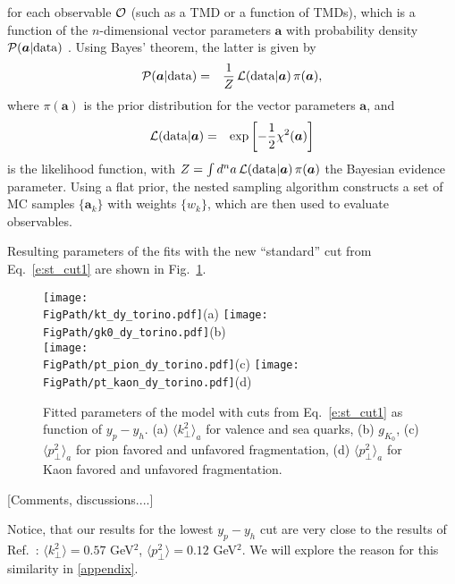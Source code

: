 \documentclass[final,3p,times,onecolumn,sort&compress,hidelinks]{elsarticle}
\newcommand\3[1]{\boldsymbol{#1}}
\newcommand*{\FigPath}{../Figs/}%
\begin{document}
%
for each observable ${\cal O}$ (such as a TMD or a function of TMDs),
which is a function of the $n$-dimensional vector parameters ${\bm a}$
with probability density ${\cal P}({\bm a}|{\rm data})$
\cite{Sato:2016wqj}.
Using Bayes' theorem, the latter is given by
%
\begin{eqnarray}
{\cal P}({\bm a}|{\rm data})
&=& \frac{1}{Z}\, {\cal L}({\rm data}|{\bm a})\, \pi({\bm a}),
\end{eqnarray}
%
where $\pi({\bm a})$ is the prior distribution for the vector
parameters ${\bm a}$, and
%
\begin{eqnarray}
{\cal L}({\rm data}|{\bm a})
&=& \exp\left[ -\frac12 \chi^2({\bm a}) \right]
\end{eqnarray}
%
is the likelihood function, with
  $Z = \int d^n a\, {\cal L}({\rm data}|{\bm a})\, \pi({\bm a})$
the Bayesian evidence parameter.
%
Using a flat prior, the nested sampling algorithm constructs a set
of MC samples $\{\bm a_k\}$ with weights $\{w_k\}$, which are then
used to evaluate observables.



Resulting parameters of the fits with  the  new ``standard'' cut from Eq.~\eqref{e:st_cut1} 
are shown in Fig.~\ref{Fig:torino}.

\begin{figure}[htb!]
\centering
\texttt{[image: \\FigPath/kt\_dy\_torino.pdf]}{\tiny(a)}%
\texttt{[image: \\FigPath/gk0\_dy\_torino.pdf]}{\tiny(b)}\\%
\texttt{[image: \\FigPath/pt\_pion\_dy\_torino.pdf]}{\tiny(c)}%
\texttt{[image: \\FigPath/pt\_kaon\_dy\_torino.pdf]}{\tiny(d)}%
\caption{\label{Fig:torino}
Fitted parameters of the model with cuts from Eq.~\eqref{e:st_cut1} as function of $y_p-y_h$. (a) $\langle k_\perp^2 \rangle_a$ for valence and sea quarks,
(b) $g_{K_0}$,
(c) $\langle p_\perp^2 \rangle_a$ for pion favored and unfavored fragmentation, (d) $\langle p_\perp^2 \rangle_a$ for Kaon favored and unfavored fragmentation.
}
\end{figure}

[Comments, discussions....]

Notice, that our results for the lowest $y_p-y_h$ cut are very close to the results of Ref.~\cite{Anselmino:2013lza}: 
$ \langle k_\perp^2 \rangle = 0.57$ GeV$^2$, $ \langle p_\perp^2 \rangle = 0.12$ GeV$^2$. We will explore the reason for this similarity in \ref{appendix}.
\end{document}
